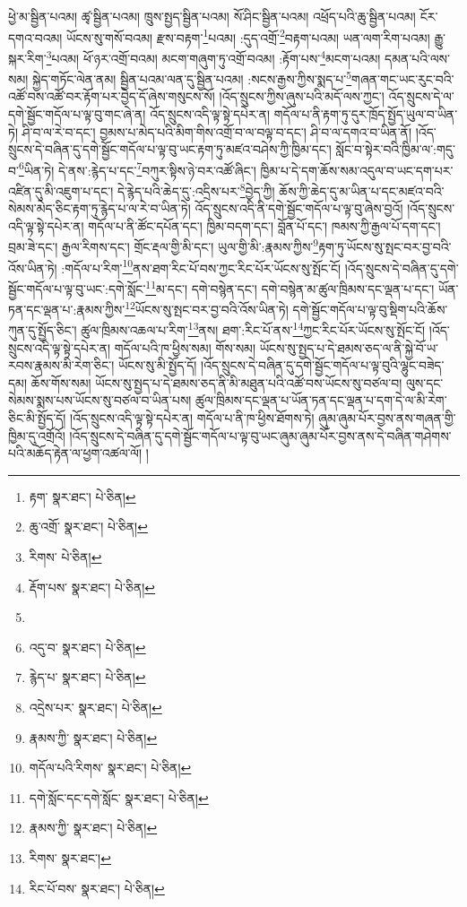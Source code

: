 ཕྱེ་མ་སྦྱིན་པའམ། ཚྭ་སྦྱིན་པའམ། ཁྲུས་སྤྱད་སྦྱིན་པའམ། སོ་ཤིང་སྦྱིན་པའམ། འཕྲོད་པའི་ཆུ་སྦྱིན་པའམ། ངོར་དགའ་བའམ། ཡོངས་སུ་གསོ་བའམ། རྫས་བརྟག་\footnote{རྟག་  སྣར་ཐང་།  པེ་ཅིན། }པའམ། :དུད་འགྲོ་\footnote{ཆུ་འགྲོ་  སྣར་ཐང་།  པེ་ཅིན། }བརྟག་པའམ། ཡན་ལག་རིག་པའམ། རྒྱུ་སྐར་རིག་\footnote{རིགས་  པེ་ཅིན། }པའམ། ཕོ་ཉར་འགྲོ་བའམ། མངག་གཞུག་ཏུ་འགྲོ་བའམ། :རྟོག་པས་\footnote{རྡོག་པས་  སྣར་ཐང་།  པེ་ཅིན། }མངག་པའམ། དམན་པའི་ལས་སམ། སྐྱེད་གཏོང་ལེན་ནམ། སྦྱིན་པའམ་ལན་དུ་སྦྱིན་པའམ། :སངས་རྒྱས་ཀྱིས་སྨད་པ་\footnote{}གཞན་གང་ཡང་རུང་བའི་འཚོ་བས་འཚོ་བར་རྟོག་པར་བྱེད་དོ་ཞེས་གསུངས་སོ། །འོད་སྲུངས་ཀྱིས་ཞུས་པའི་མདོ་ལས་ཀྱང་། འོད་སྲུངས་དེ་ལ་དགེ་སྦྱོང་གདོལ་པ་ལྟ་བུ་གང་ཞེ་ན། འོད་སྲུངས་འདི་ལྟ་སྟེ་དཔེར་ན། གདོལ་པ་ནི་རྟག་ཏུ་དུར་ཁྲོད་སྤྱོད་ཡུལ་བ་ཡིན་ཏེ། ཤི་བ་ལ་རེ་བ་དང་། བྱམས་པ་མེད་པའི་མིག་གིས་འགྲོ་བ་ལ་བལྟ་བ་དང་། ཤི་བ་ལ་དགའ་བ་ཡིན་ནོ། །འོད་སྲུངས་དེ་བཞིན་དུ་དགེ་སྦྱོང་གདོལ་པ་ལྟ་བུ་ཡང་རྟག་ཏུ་མཛའ་བཤེས་ཀྱི་ཁྱིམ་དང་། སློང་བ་སྟེར་བའི་ཁྱིམ་ལ་:གདུ་བ་\footnote{འདུ་བ་  སྣར་ཐང་།  པེ་ཅིན། }ཡིན་ཏེ། དེ་ནས་:རྙེད་པ་དང་\footnote{རྙེད་པ་  སྣར་ཐང་།  པེ་ཅིན། }བཀུར་སྟིས་ཉེ་བར་འཚོ་ཞིང་། ཁྱིམ་པ་དེ་དག་ཆོས་སམ་འདུལ་བ་ཡང་དག་པར་འཛིན་དུ་མི་འཇུག་པ་དང་། དེ་རྙེད་པའི་ཆེད་དུ་:འདྲིས་པར་\footnote{འདྲེས་པར་  སྣར་ཐང་།  པེ་ཅིན། }བྱེད་ཀྱི། ཆོས་ཀྱི་ཆེད་དུ་མ་ཡིན་པ་དང་མཛའ་བའི་སེམས་མེད་ཅིང་རྟག་ཏུ་རྙེད་པ་ལ་རེ་བ་ཡིན་ཏེ། འོད་སྲུངས་འདི་ནི་དགེ་སྦྱོང་གདོལ་པ་ལྟ་བུ་ཞེས་བྱའོ། །འོད་སྲུངས་འདི་ལྟ་སྟེ་དཔེར་ན། གདོལ་པ་ནི་ཚོང་དཔོན་དང་། ཁྱིམ་བདག་དང་། བློན་པོ་དང་། ཁམས་ཀྱི་རྒྱལ་པོ་དག་དང་། བྲམ་ཟེ་དང་། རྒྱལ་རིགས་དང་། གྲོང་རྡལ་གྱི་མི་དང་། ཡུལ་གྱི་མི་:རྣམས་ཀྱིས་\footnote{རྣམས་ཀྱི་  སྣར་ཐང་།  པེ་ཅིན། }རྟག་ཏུ་ཡོངས་སུ་སྤང་བར་བྱ་བའི་འོས་ཡིན་ཏེ། :གདོལ་པ་རིག་\footnote{གདོལ་པའི་རིགས་  སྣར་ཐང་།  པེ་ཅིན། }ནས་ཐག་རིང་པོ་བས་ཀྱང་རིང་པོར་ཡོངས་སུ་སྤོང་ངོ། །འོད་སྲུངས་དེ་བཞིན་དུ་དགེ་སྦྱོང་གདོལ་པ་ལྟ་བུ་ཡང་:དགེ་སློང་\footnote{དགེ་སློང་དང་དགེ་སློང་  སྣར་ཐང་།  པེ་ཅིན། }མ་དང་། དགེ་བསྙེན་དང་། དགེ་བསྙེན་མ་ཚུལ་ཁྲིམས་དང་ལྡན་པ་དང་། ཡོན་ཏན་དང་ལྡན་པ་:རྣམས་ཀྱིས་\footnote{རྣམས་ཀྱི་  སྣར་ཐང་།  པེ་ཅིན། }ཡོངས་སུ་སྤང་བར་བྱ་བའི་འོས་ཡིན་ཏེ། དགེ་སྦྱོང་གདོལ་པ་ལྟ་བུ་སྡིག་པའི་ཆོས་ཀུན་དུ་སྤྱོད་ཅིང་། ཚུལ་ཁྲིམས་འཆལ་པ་རིག་\footnote{རིགས་  སྣར་ཐང་། }ནས། ཐག་:རིང་པོ་ནས་\footnote{རིང་པོ་བས་  སྣར་ཐང་།  པེ་ཅིན། }ཀྱང་རིང་པོར་ཡོངས་སུ་སྤོང་ངོ། །འོད་སྲུངས་འདི་ལྟ་སྟེ་དཔེར་ན། གདོལ་པའི་ཁ་ཕྱིས་སམ། གོས་སམ། ཡོངས་སུ་སྤྱད་པ་དེ་ཐམས་ཅད་ལ་ནི་སྐྱེ་བོ་ཡ་རབས་རྣམས་མི་རེག་ཅིང་། ཡོངས་སུ་མི་སྤྱོད་དོ། །འོད་སྲུངས་དེ་བཞིན་དུ་དགེ་སྦྱོང་གདོལ་པ་ལྟ་བུའི་ལྷུང་བཟེད་དམ། ཆོས་གོས་སམ། ཡོངས་སུ་སྤྱད་པ་དེ་ཐམས་ཅད་ནི་མི་མཐུན་པའི་འཚོ་བས་ཡོངས་སུ་བཙལ་བ། ལུས་དང་སེམས་སྨས་པས་ཡོངས་སུ་བཙལ་བ་ཡིན་པས། ཚུལ་ཁྲིམས་དང་ལྡན་པ་ཡོན་ཏན་དང་ལྡན་པ་དག་དེ་ལ་མི་རེག་ཅིང་མི་སྤྱོད་དོ། །འོད་སྲུངས་འདི་ལྟ་སྟེ་དཔེར་ན། གདོལ་པ་ནི་ཁ་ཕྱིས་ཐོགས་ཏེ། ཞུམ་ཞུམ་པོར་བྱས་ནས་གཞན་གྱི་ཁྱིམ་དུ་འགྲོའོ། །འོད་སྲུངས་དེ་བཞིན་དུ་དགེ་སྦྱོང་གདོལ་པ་ལྟ་བུ་ཡང་ཞུམ་ཞུམ་པོར་བྱས་ནས་དེ་བཞིན་གཤེགས་པའི་མཆོད་རྟེན་ལ་ཕྱག་འཚལ་ལོ། །
